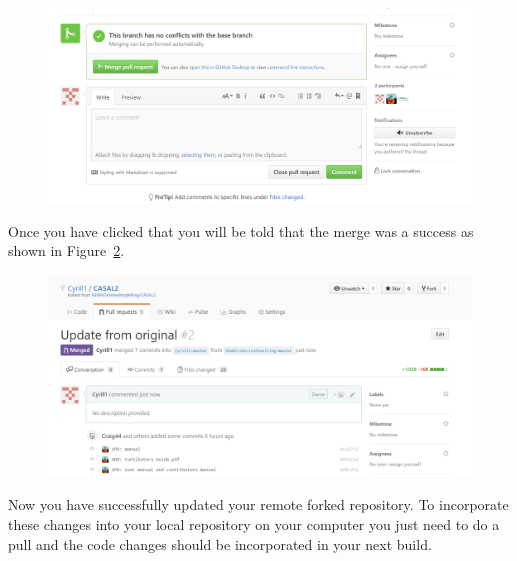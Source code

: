 \begin{figure}[!ht]
	\centering
	\includegraphics[scale=0.6]{Figures/Compare_fork6.png}
	\caption{}\label{fig:fork_compare4}
\end{figure}
\clearpage
Once you have clicked that you will be told that the merge was a success as shown in Figure~\ref{fig:fork_compare5}.
\begin{figure}[!ht]
	\centering
	\includegraphics[scale=0.6]{Figures/Compare_fork7.png}
	\caption{}\label{fig:fork_compare5}
\end{figure}

Now you have successfully updated your remote forked repository. To incorporate these changes into your local repository on your computer you just need to do a pull and the code changes should be incorporated in your next build.
